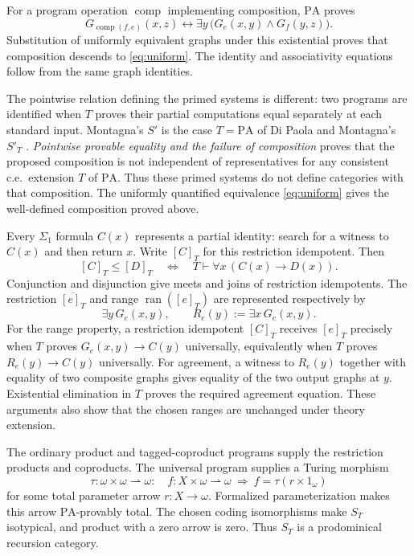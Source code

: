\documentclass[11pt]{article}
\newcommand{\PA}{\mathrm{PA}}
\newcommand{\ran}{\operatorname{ran}}
\begin{document}
For a program operation $\operatorname{comp}$ implementing composition,
$\PA$ proves
\begin{equation}\label{eq:composition}
 G_{\operatorname{comp}(f,e)}(x,z)
 \leftrightarrow
 \exists y\,\bigl(G_e(x,y)\land G_f(y,z)\bigr).
\end{equation}
Substitution of uniformly equivalent graphs under this existential proves
that composition descends to \eqref{eq:uniform}. The identity and
associativity equations follow from the same graph identities.

The pointwise relation defining the primed systems is different:
two programs are identified when $T$ proves their partial computations
equal separately at each standard input. Montagna's $S'$ is the case
$T=\PA$ of Di Paola and Montagna's $S'_T$ \cite{Montagna,DPM}.
\emph{Pointwise provable equality and the failure of composition}
\cite[Corollary 2]{Composition} proves that the proposed composition
is not independent of representatives for any consistent c.e.\
extension $T$ of $\PA$. Thus these primed systems do not define
categories with that composition. The uniformly quantified equivalence
\eqref{eq:uniform} gives the well-defined composition proved above.

Every $\Sigma_1$ formula $C(x)$ represents a partial identity: search for
a witness to $C(x)$ and then return $x$. Write $[C]_T$ for this
restriction idempotent.
Then
\begin{equation}\label{eq:domain-order}
 [C]_T\le[D]_T
 \quad\Longleftrightarrow\quad
 T\vdash\forall x\,(C(x)\longrightarrow D(x)).
\end{equation}
Conjunction and disjunction give meets and joins of restriction
idempotents. The restriction $\overline{[e]_T}$ and range $\ran([e]_T)$
are represented respectively by
\[
 \exists y\,G_e(x,y),\qquad
 R_e(y):=\exists x\,G_e(x,y).
\]
For the range property, a restriction idempotent $[C]_T$ receives
$[e]_T$ precisely when
$T$ proves $G_e(x,y)\to C(y)$ universally, equivalently when
$T$ proves $R_e(y)\to C(y)$ universally. For agreement, a witness to
$R_e(y)$ together with equality of two composite graphs gives equality
of the two output graphs at $y$. Existential elimination in $T$ proves
the required agreement equation. These arguments also show that the
chosen ranges are unchanged under theory extension.

The ordinary product and tagged-coproduct programs supply the restriction
products and coproducts. The universal program supplies a Turing morphism
\[
 \tau:\omega\times\omega\rightharpoonup\omega:
 \quad f:X\times\omega\rightharpoonup\omega
 \ \Longrightarrow\ 
 f=\tau(r\times1_\omega)
\]
for some total parameter arrow $r:X\to\omega$. Formalized
parameterization makes this arrow $\PA$-provably total. The chosen coding
isomorphisms make $S_T$ isotypical, and product with a zero arrow is zero.
Thus $S_T$ is a prodominical recursion category.
\end{document}
